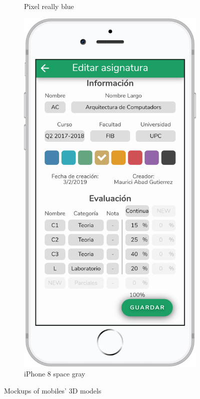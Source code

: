 \begin{figure}[ht!]
\begin{subfigure}[b]{0.3\textwidth-0.1cm}
        \caption{Pixel really blue}
    \end{subfigure}
    \hfill
    \begin{subfigure}[b]{0.3\textwidth-0.1cm}
        \centering
        \includegraphics[width=\textwidth]{media/mockups/mockup-iphone-gray.png}
        \caption{iPhone 8 space gray}
    \end{subfigure}
    \caption{Mockups of mobiles' 3D models}
    \label{fig:mockup-phone}
\end{figure}
\vfill

